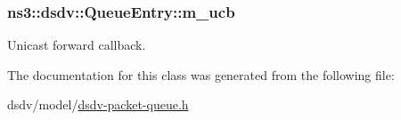 \subsubsection[{\texorpdfstring{m\+\_\+ucb}{m_ucb}}]{ ns3\+::dsdv\+::\+Queue\+Entry\+::m\+\_\+ucb\hspace{0.3cm}{\ttfamily [private]}}\hypertarget{classns3_1_1dsdv_1_1QueueEntry_a7147d9625ce302ebba00e81554275033}{}\label{classns3_1_1dsdv_1_1QueueEntry_a7147d9625ce302ebba00e81554275033}


Unicast forward callback. 



The documentation for this class was generated from the following file\+:\begin{DoxyCompactItemize}
\item 
dsdv/model/\hyperlink{dsdv-packet-queue_8h}{dsdv-\/packet-\/queue.\+h}\end{DoxyCompactItemize}
